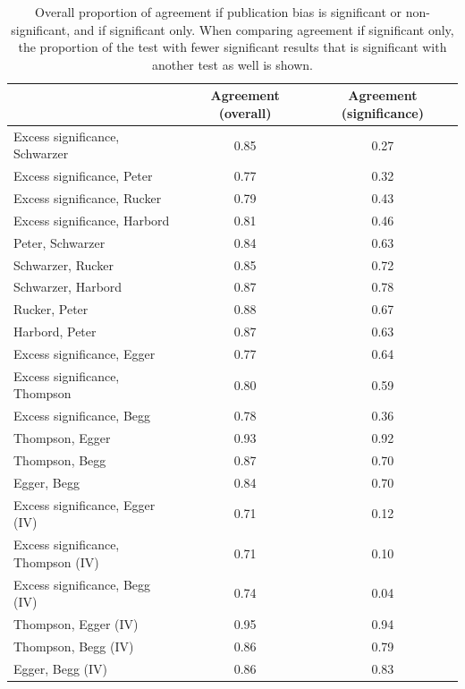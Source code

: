 \documentclass[11pt,a4paper,twoside]{book}\usepackage[]{graphicx}\usepackage[]{color}
\begin{document}
\begin{table}[ht]
\centering
\begingroup\scriptsize
\begin{tabular}{lcc}
  \hline
 & Agreement (overall) & Agreement (significance) \\ 
  \hline
Excess significance, Schwarzer & 0.85 & 0.27 \\ 
  Excess significance, Peter & 0.77 & 0.32 \\ 
  Excess significance, Rucker & 0.79 & 0.43 \\ 
  Excess significance, Harbord & 0.81 & 0.46 \\ 
  Peter, Schwarzer & 0.84 & 0.63 \\ 
  Schwarzer, Rucker & 0.85 & 0.72 \\ 
  Schwarzer, Harbord & 0.87 & 0.78 \\ 
  Rucker, Peter & 0.88 & 0.67 \\ 
  Harbord, Peter & 0.87 & 0.63 \\ 
  Excess significance, Egger & 0.77 & 0.64 \\ 
  Excess significance, Thompson & 0.80 & 0.59 \\ 
  Excess significance, Begg & 0.78 & 0.36 \\ 
  Thompson, Egger & 0.93 & 0.92 \\ 
  Thompson, Begg & 0.87 & 0.70 \\ 
  Egger, Begg & 0.84 & 0.70 \\ 
  Excess significance, Egger (IV) & 0.71 & 0.12 \\ 
  Excess significance, Thompson (IV) & 0.71 & 0.10 \\ 
  Excess significance, Begg (IV) & 0.74 & 0.04 \\ 
  Thompson, Egger (IV) & 0.95 & 0.94 \\ 
  Thompson, Begg (IV) & 0.86 & 0.79 \\ 
  Egger, Begg (IV) & 0.86 & 0.83 \\ 
   \hline
\end{tabular}
\endgroup
\caption{Overall proportion of agreement if publication bias is significant or non-significant, and if significant only. When comparing agreement if significant only, the proportion of the test with fewer significant results that is significant with another test as well is shown.} 
\label{test.agreement}
\end{table}
\end{document}
